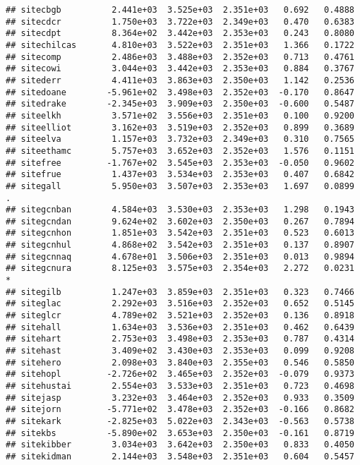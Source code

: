 \documentclass[
]{article}
\begin{document}
\begin{verbatim}
## sitecbgb          2.441e+03  3.525e+03  2.351e+03   0.692   0.4888  
## sitecdcr          1.750e+03  3.722e+03  2.349e+03   0.470   0.6383  
## sitecdpt          8.364e+02  3.442e+03  2.353e+03   0.243   0.8080  
## sitechilcas       4.810e+03  3.522e+03  2.351e+03   1.366   0.1722  
## sitecomp          2.486e+03  3.488e+03  2.352e+03   0.713   0.4761  
## sitecowi          3.044e+03  3.442e+03  2.353e+03   0.884   0.3767  
## sitederr          4.411e+03  3.863e+03  2.350e+03   1.142   0.2536  
## sitedoane        -5.961e+02  3.498e+03  2.352e+03  -0.170   0.8647  
## sitedrake        -2.345e+03  3.909e+03  2.350e+03  -0.600   0.5487  
## siteelkh          3.571e+02  3.556e+03  2.351e+03   0.100   0.9200  
## siteelliot        3.162e+03  3.519e+03  2.352e+03   0.899   0.3689  
## siteelva          1.157e+03  3.732e+03  2.349e+03   0.310   0.7565  
## siteethamc        5.757e+03  3.652e+03  2.352e+03   1.576   0.1151  
## sitefree         -1.767e+02  3.545e+03  2.353e+03  -0.050   0.9602  
## sitefrue          1.437e+03  3.534e+03  2.353e+03   0.407   0.6842  
## sitegall          5.950e+03  3.507e+03  2.353e+03   1.697   0.0899 .
## sitegcnban        4.584e+03  3.530e+03  2.353e+03   1.298   0.1943  
## sitegcndan        9.624e+02  3.602e+03  2.350e+03   0.267   0.7894  
## sitegcnhon        1.851e+03  3.542e+03  2.351e+03   0.523   0.6013  
## sitegcnhul        4.868e+02  3.542e+03  2.351e+03   0.137   0.8907  
## sitegcnnaq        4.678e+01  3.506e+03  2.351e+03   0.013   0.9894  
## sitegcnura        8.125e+03  3.575e+03  2.354e+03   2.272   0.0231 *
## sitegilb          1.247e+03  3.859e+03  2.351e+03   0.323   0.7466  
## siteglac          2.292e+03  3.516e+03  2.352e+03   0.652   0.5145  
## siteglcr          4.789e+02  3.521e+03  2.352e+03   0.136   0.8918  
## sitehall          1.634e+03  3.536e+03  2.351e+03   0.462   0.6439  
## sitehart          2.753e+03  3.498e+03  2.353e+03   0.787   0.4314  
## sitehast          3.409e+02  3.430e+03  2.353e+03   0.099   0.9208  
## sitehero          2.098e+03  3.840e+03  2.355e+03   0.546   0.5850  
## sitehopl         -2.726e+02  3.465e+03  2.352e+03  -0.079   0.9373  
## sitehustai        2.554e+03  3.533e+03  2.351e+03   0.723   0.4698  
## sitejasp          3.232e+03  3.464e+03  2.352e+03   0.933   0.3509  
## sitejorn         -5.771e+02  3.478e+03  2.352e+03  -0.166   0.8682  
## sitekark         -2.825e+03  5.022e+03  2.343e+03  -0.563   0.5738  
## sitekbs          -5.890e+02  3.653e+03  2.350e+03  -0.161   0.8719  
## sitekibber        3.034e+03  3.642e+03  2.350e+03   0.833   0.4050  
## sitekidman        2.144e+03  3.548e+03  2.351e+03   0.604   0.5457  

\end{verbatim}
\end{document}
